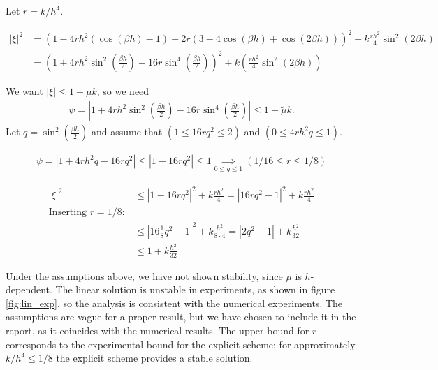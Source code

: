 Let $r = k/h^4$.

\begin{align*}
|\xi |^2 &= (1-4rh^2(\cos(\beta h)-1)-2r(3-4\cos(\beta h)+\cos(2\beta h)))^2 + k\frac{rh^2}{4}\sin^2(2\beta h) \\
&= \left(1+4rh^2\sin^2\left(\frac{\beta h}{2}\right)-16r\sin^4\left(\frac{\beta h}{2}\right)\right)^2 + k\left(\frac{rh^2}{4}\sin^2(2\beta h)\right)
\end{align*}

We want $|\xi| \le 1+ \mu k$, so we need 
\begin{align*}
\psi = |1+4rh^2\sin^2\left(\frac{\beta h}{2}\right)-16r\sin^4\left(\frac{\beta h}{2}\right)| \le 1 + \tilde{\mu}k.
\end{align*}
Let $q = \sin^2\left(\frac{\beta h}{2}\right)$ and assume that $(1 \le 16rq^2 \le 2)$ and $(0 \le 4rh^2q \le 1)$.

\begin{align*}
\psi = \left| 1+4rh^2q -16rq^2\right| \le \left| 1-16rq^2\right| \le 1 \underset{0\le q\le 1}{\implies} \left(1/16 \le r \le 1/8 \right)
\end{align*} 

\begin{align*}
|\xi |^2 &\le |1-16rq^2|^2 + k\frac{rh^2}{4} = |16rq^2-1|^2  + k\frac{rh^2}{4} \\
\textrm{Inserting } r = 1/8: \\
&\le |16\frac{1}{8}q^2-1|^2 + k\frac{h^2}{8\cdot 4} = |2q^2-1| + k\frac{h^2}{32} \\
&\le 1 + k\frac{h^2}{32}
\end{align*}

Under the assumptions above, we have not shown stability, since $\mu$ is $h$-dependent. The linear solution is unstable in experiments, as shown in figure \ref{fig:lin_exp}, so the analysis is consistent with the numerical experiments. The assumptions are vague for a proper result, but we have chosen to include it in the report, as it coincides with the numerical results. The upper bound for $r$ corresponds to the experimental bound for the explicit scheme; for approximately $k/h^4 \le 1/8$ the explicit scheme provides a stable solution. 



